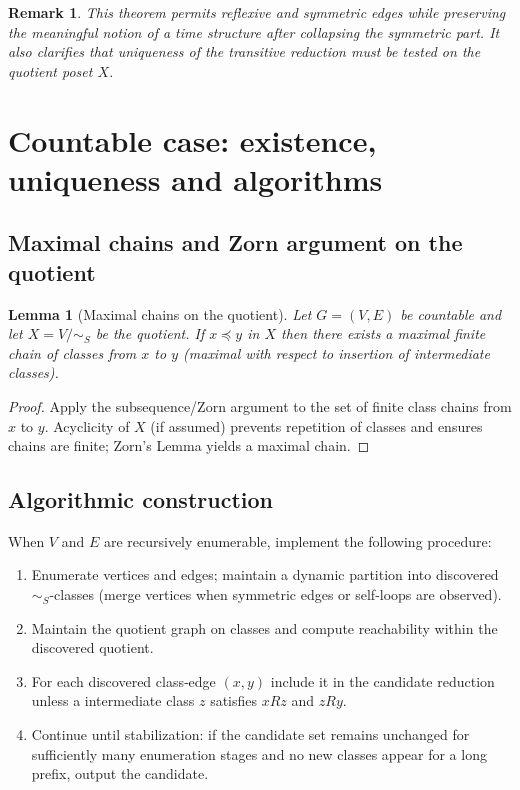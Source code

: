 \documentclass[11pt]{article}
\newtheorem{lemma}[definition]{Lemma}
\newtheorem{remark}[definition]{Remark}
\begin{document}
\begin{remark}
This theorem permits reflexive and symmetric edges while preserving
the meaningful notion of a time structure after collapsing the symmetric
part. It also clarifies that uniqueness of the transitive reduction must
be tested on the quotient poset \(X\).
\end{remark}

\section{Countable case: existence, uniqueness and algorithms}\label{sec:countable_alg}
\subsection{Maximal chains and Zorn argument on the quotient}
\begin{lemma}[Maximal chains on the quotient]
Let \(G=(V,E)\) be countable and let \(X=V/\!\sim_S\) be the quotient.
If \(x\preceq y\) in \(X\) then there exists a maximal finite chain of
classes from \(x\) to \(y\) (maximal with respect to insertion of
intermediate classes).
\end{lemma}

\begin{proof}
Apply the subsequence/Zorn argument to the set of finite class chains
from \(x\) to \(y\). Acyclicity of \(X\) (if assumed) prevents repetition
of classes and ensures chains are finite; Zorn's Lemma yields a maximal
chain.
\end{proof}




\subsection{Algorithmic construction}
When \(V\) and \(E\) are recursively enumerable, implement the following
procedure:

\begin{enumerate}
  \item Enumerate vertices and edges; maintain a dynamic partition into
    discovered \(\sim_S\)-classes (merge vertices when symmetric edges or
    self‑loops are observed).
  \item Maintain the quotient graph on classes and compute
    reachability within the discovered quotient.
  \item For each discovered class‑edge \((x,y)\) include it in the
    candidate reduction unless a  intermediate class \(z\)
    satisfies \(xR z\) and \(zR y\).
  \item Continue until stabilization: if the candidate set remains
    unchanged for sufficiently many enumeration stages and no new classes
    appear for a long prefix, output the candidate.
\end{enumerate}
\end{document}
